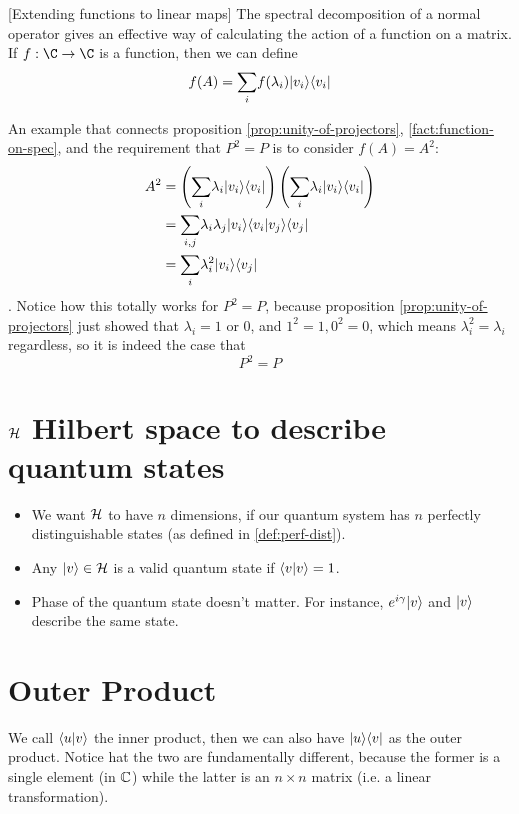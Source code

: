 \documentclass[12pt]{article}
\begin{document}
\begin{fact}\label{fact:function-on-spec}[Extending functions to linear maps]
The spectral decomposition of a normal operator gives an effective way of calculating the action of a function on a matrix. If $f: \C\rightarrow \C$ is a function, then we can define $$
f(A) = \underset{i}{\sum} f(\lambda_i) \Ket{v_i} \Bra{v_i}
$$
\end{fact}

\begin{example}
An example that connects proposition \ref{prop:unity-of-projectors}, \ref{fact:function-on-spec}, and the requirement that $P^2 = P$ is to consider $f(A) = A^2$: $$
\begin{aligned}
A^2
    &= \prt{\underset{i}{\sum}\lambda_i\Ket{v_i}\Bra{v_i}}\prt{\underset{i}{\sum}\lambda_i\Ket{v_i}\Bra{v_i}}\\
    &= \underset{i,j}{\sum}\lambda_i\lambda_j\Ket{v_i}\bk{v_i}{v_j}\Bra{v_j}\\
    &= \underset{i}{\sum}\lambda_i^2\Ket{v_i}\Bra{v_j}
\end{aligned}
$$. Notice how this totally works for $P^2 = P$, because proposition \ref{prop:unity-of-projectors} just showed that $\lambda_i=1$ or $0$, and $1^2 = 1, 0^2 = 0$, which means $\lambda_i^2 = \lambda_i$ regardless, so it is indeed the case that $$
P^2 = P
$$
\end{example}

\section{$\HHH$ Hilbert space to describe quantum states}
\begin{itemize}
    \item We want $\HHH$ to have $n$ dimensions, if our quantum system has $n$ perfectly distinguishable states (as defined in \ref{def:perf-dist}).
    \item Any $\Ket{v}\in \HHH$ is a valid quantum state if $\bk{v}{v} = 1$.
    \item Phase of the quantum state doesn't matter. For instance, $e^{i\gamma}\Ket{v}$ and $\Ket{v}$ describe the same state.
\end{itemize}

\section{Outer Product}
We call $\bk{u}{v}$ the inner product, then we can also have $\Ket{u}\Bra{v}$ as the outer product. Notice hat the two are fundamentally different, because the former is a single element (in $\CC$) while the latter is an $n\times n$ matrix (i.e. a linear transformation).
\end{document}
